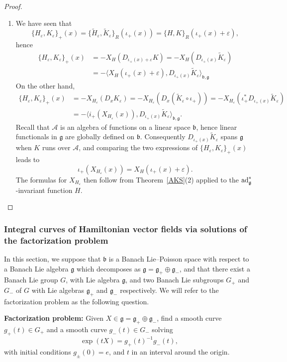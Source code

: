 \documentclass[a4paper,12pt,reqno]{amsart}%
\theoremstyle{definition}
\theoremstyle{remark}
\numberwithin{theorem}{section}
\numberwithin{equation}{section}
\newcommand{\1}{{\bf 1}}
\DeclareMathOperator{\ad}{\textnormal{ad}}
\newcommand{\g}{{\mathfrak g}}
\newcommand{\bg}{{\mathfrak b}}
\begin{document}
\begin{proof}
\begin{enumerate}
\item We have seen that
\[
\{ H_\varepsilon, K_\varepsilon\}_+(x) = \{\tilde{H}_\varepsilon, \tilde{K}_\varepsilon\}_R(\iota_+(x)) 
     = \{ H, K\}_R(\iota_+(x)+\varepsilon),
\]
hence 
\begin{align*}
    \{ H_\varepsilon, K_\varepsilon\}_+(x) &  = -X_H(D_{\iota_+(x)+\varepsilon}K) = -X_H(D_{\iota_+(x)}\tilde{K}_\varepsilon)\\& = -\langle X_H(\iota_+(x)+\varepsilon), D_{\iota_+(x)}\tilde{K}_\varepsilon\rangle_{\bg,\g} 
    \end{align*}
On the other hand,
\begin{align*}
    \{ H_\varepsilon, K_\varepsilon\}_+(x) &= -X_{H_\varepsilon}(D_x K_\varepsilon)  = -X_{H_\varepsilon}(D_x (\tilde{K}_\varepsilon\circ \iota_+)) = -X_{H_\varepsilon}( \iota_+^*D_{\iota_+(x)}\tilde{K}_\varepsilon)\\&  = -\langle i_+(X_{H_\varepsilon}(x)), D_{\iota_+(x)}\tilde{K}_\varepsilon\rangle_{\bg, \g}.  
    \end{align*}
     Recall that $\mathcal{A}$ is an algebra of functions on a linear space $\bg$, hence linear functionals in $\g$ are globally defined on $\bg$. Consequently $D_{\iota_+(x)}\tilde{K}_\varepsilon$ spans $\g$ when $K$ runs over $\mathcal{A}$, and comparing the two expressions of $\{ H_\varepsilon, K_\varepsilon\}_+(x)$ leads to
    \[
\iota_+(X_{H_\varepsilon}(x)) = X_H(\iota_+(x)+\varepsilon).
    \]
    The formulas for $X_{H_\varepsilon}$ then follow from  Theorem~\ref{AKS}(2) applied to the $\ad^*_\g$-invariant function $H$.


\end{enumerate}


    
\end{proof}
\subsubsection{Integral curves of Hamiltonian vector fields via solutions of the factorization problem}\label{factorization}
In this section, we suppose that $\bg$ is a Banach Lie--Poisson space with respect to a Banach Lie algebra $\g$ which decomposes as $\g = \g_+\oplus \g_-$, and
     that there exist a Banach Lie group $G$, with Lie algebra $\g$, and  two Banach Lie subgroups $G_+$ and $G_-$ of $G$ with Lie algebras $\g_+$ and $\g_-$ respectively. 
We will refer to the factorization problem as the following question. 

\textbf{Factorization problem:}\label{factpb}
Given $X\in \g = \g_+ \oplus \g_-$, find 
 a smooth curve $g_+(t)\in G_+$ and a smooth curve $g_-(t)\in G_-$ solving 
    \begin{equation}\label{factorisation0}
    \exp(tX) = g_+(t)^{-1} g_-(t), 
    \end{equation}
    with initial conditions $g_\pm(0) = e$, and $t$ in an interval around the origin.
  
\end{document}
